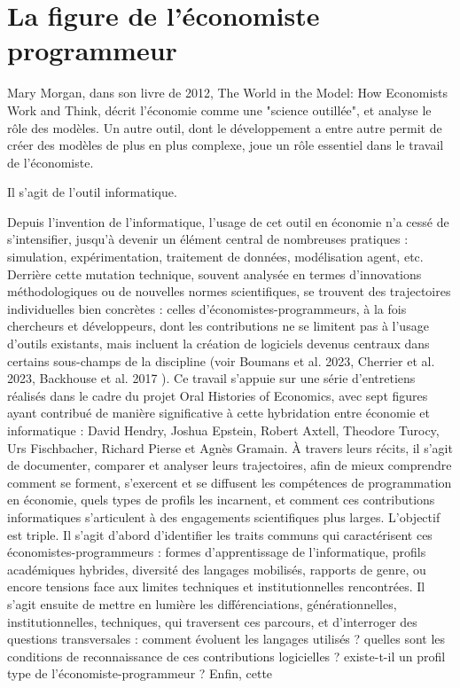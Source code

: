 \chapter{La figure de l'économiste programmeur} %


Mary Morgan, dans son livre de 2012, The World in the Model: How Economists Work and Think\cite{morganWorldModel}, décrit l'économie comme une "science outillée", et analyse le rôle des modèles. Un autre outil, dont le développement a entre autre permit de créer des modèles de plus en plus complexe, joue un rôle essentiel dans le travail de l'économiste. 

Il s'agit de l'outil informatique.

Depuis l'invention de l'informatique, l’usage de cet outil en économie n’a cessé de s’intensifier, jusqu’à devenir un élément central de nombreuses pratiques : simulation, expérimentation, traitement de données, modélisation agent, etc. Derrière cette mutation technique, souvent analysée en termes d’innovations méthodologiques ou de nouvelles normes scientifiques, se trouvent des trajectoires individuelles bien concrètes : celles d’économistes-programmeurs, à la fois chercheurs et développeurs, dont les contributions ne se limitent pas à l’usage d’outils existants, mais incluent la création de logiciels devenus centraux dans certains sous-champs de la discipline (voir Boumans et al. 2023\cite{boumansComputerizationEconomicsThree2023}, Cherrier et al. 2023\cite{cherrierWriteYourModel2023}, Backhouse et al. 2017 \cite{backhouseItsComputersStupid2017}). Ce travail s’appuie sur une série d’entretiens réalisés dans le cadre du projet Oral Histories of Economics, avec sept figures ayant contribué de manière significative à cette hybridation entre économie et informatique : David Hendry\cite{hendryInterviewDavidHendry2024}, Joshua Epstein\cite{epsteinInterviewJoshuaEpstein2024}, Robert Axtell\cite{axtellInterviewRobertAxtell2025}, Theodore Turocy\cite{turocyInterviewTheodoreTurocy2024}, Urs Fischbacher\cite{fischbacherInterviewUrsFischbacher2024}, Richard Pierse\cite{pierseInterviewRichardPierse2024} et Agnès Gramain\cite{gramainInterviewAgnesGramain2024}. À travers leurs récits, il s’agit de documenter, comparer et analyser leurs trajectoires, afin de mieux comprendre comment se forment, s’exercent et se diffusent les compétences de programmation en économie, quels types de profils les incarnent, et comment ces contributions informatiques s’articulent à des engagements scientifiques plus larges. L’objectif est triple. Il s’agit d’abord d’identifier les traits communs qui caractérisent ces économistes-programmeurs : formes d’apprentissage de l’informatique, profils académiques hybrides, diversité des langages mobilisés, rapports de genre, ou encore tensions face aux limites techniques et institutionnelles rencontrées. Il s’agit ensuite de mettre en lumière les différenciations, générationnelles, institutionnelles, techniques, qui traversent ces parcours, et d’interroger des questions transversales : comment évoluent les langages utilisés ? quelles sont les conditions de reconnaissance de ces contributions logicielles ? existe-t-il un profil type de l’économiste-programmeur ? Enfin, cette 